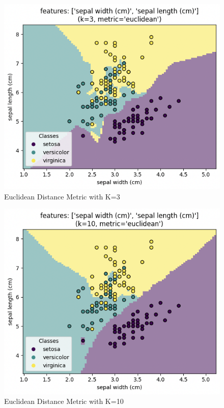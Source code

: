 \documentclass[journal]{IEEEtran}
\begin{document}
\begin{figure}[h!]
\includegraphics[scale=0.4]{euclidean_k3.png}
\centering
\caption{Euclidean Distance Metric with K=3}
\label{fig:euclk3}
\end{figure}

\begin{figure}[h!]
\includegraphics[scale=0.4]{euclidean_k10.png}
\centering
\caption{Euclidean Distance Metric with K=10}
\label{fig:euclk10}
\end{figure}
\end{document}

